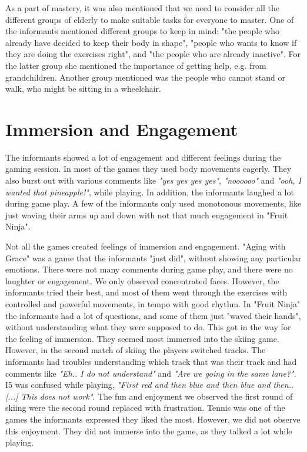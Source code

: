 As a part of mastery, it was also mentioned that we need to consider all the different groups of elderly to make suitable tasks for everyone to master. One of the informants mentioned different groups to keep in mind: "the people who already have decided to keep their body in shape", "people who wants to know if they are doing the exercises right", and "the people who are already inactive". For the latter group she mentioned the importance of getting help, e.g. from grandchildren.  Another group mentioned was the people who cannot stand or walk, who might be sitting in a wheelchair.

\section{Immersion and Engagement}
The informants showed a lot of engagement and different feelings during the gaming session. In most of the games they used body movements eagerly. They also burst out with various comments like \emph{"yes yes yes yes"}, \emph{"noooooo"} and \emph{"ooh, I wanted that pineapple!"}, while playing. In addition, the informants laughed a lot during game play. A few of the informants only used monotonous movements, like just waving their arms up and down with not that much engagement in "Fruit Ninja".  

Not all the games created feelings of immersion and engagement. "Aging with Grace" was a game that the informants "just did", without showing any particular emotions. There were not many comments during game play, and there were no laughter or engagement. We only observed concentrated faces. However, the informants tried their best, and most of them went through the exercises with controlled and powerful movements, in tempo with good rhythm. In "Fruit Ninja" the informants had a lot of questions, and some of them just "waved their hands", without understanding what they were supposed to do. This got in the way for the feeling of immersion. They seemed most immersed into the skiing game. However, in the second match of skiing the players switched tracks. The informants had troubles understanding which track that was their track and had comments like \emph{"Eh.. I do not understand"} and \emph{"Are we going in the same lane?"}. I5 was confused while playing, \emph{"First red and then blue and then blue and then.. [...] This does not work"}. The fun and enjoyment we observed the first round of skiing were the second round replaced with frustration. Tennis was one of the games the informants expressed they liked the most. However, we did not observe this enjoyment. They did not immerse into the game, as they talked a lot while playing. 

